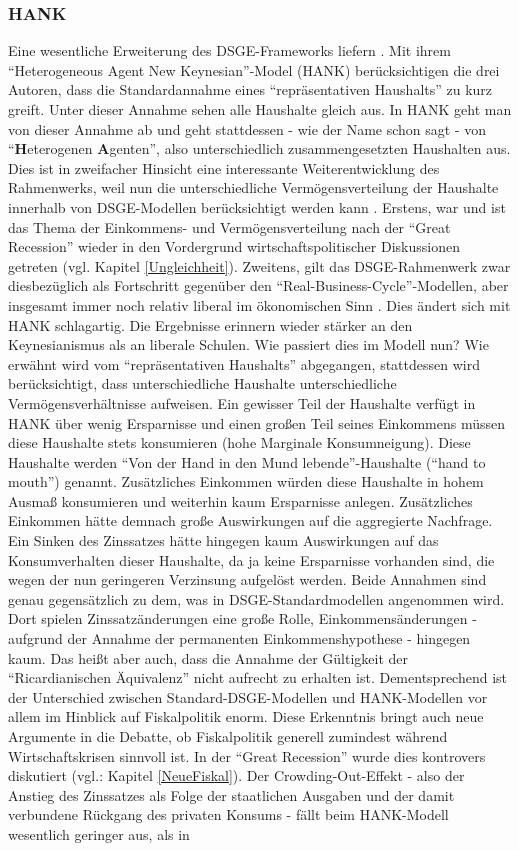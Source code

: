 \subsubsection{HANK}
Eine wesentliche Erweiterung des DSGE-Frameworks liefern \textcite{Kaplan2018}. Mit ihrem "`Heterogeneous Agent New Keynesian"'-Model (HANK) berücksichtigen die drei Autoren, dass die Standardannahme eines "`repräsentativen Haushalts"' zu kurz greift. Unter dieser Annahme sehen alle Haushalte gleich aus. In HANK geht man von dieser Annahme ab und geht stattdessen - wie der Name schon sagt - von "`\textbf{H}eterogenen \textbf{A}genten"', also unterschiedlich zusammengesetzten Haushalten aus. Dies ist in zweifacher Hinsicht eine interessante Weiterentwicklung des Rahmenwerks, weil nun die unterschiedliche Vermögensverteilung der Haushalte innerhalb von DSGE-Modellen berücksichtigt werden kann \parencite[S. 167]{Kaplan2018b}. Erstens, war und ist das Thema der Einkommens- und Vermögensverteilung nach der "`Great Recession"' wieder in den Vordergrund wirtschaftspolitischer Diskussionen getreten (vgl. Kapitel \ref{Ungleichheit}). Zweitens, gilt das DSGE-Rahmenwerk zwar diesbezüglich als Fortschritt gegenüber den "`Real-Business-Cycle"'-Modellen, aber insgesamt immer noch relativ liberal im ökonomischen Sinn \parencite[S. 309]{Romer2019}. Dies ändert sich mit HANK schlagartig. Die Ergebnisse erinnern wieder stärker an den Keynesianismus als an liberale Schulen. Wie passiert dies im Modell nun? Wie erwähnt wird vom "`repräsentativen Haushalts"' abgegangen, stattdessen wird berücksichtigt, dass unterschiedliche Haushalte unterschiedliche Vermögensverhältnisse aufweisen. Ein gewisser Teil der Haushalte verfügt in HANK über wenig Ersparnisse und einen großen Teil seines Einkommens müssen diese Haushalte stets konsumieren (hohe Marginale Konsumneigung). Diese Haushalte werden "`Von der Hand in den Mund lebende"'-Haushalte ("`hand to mouth"') genannt. Zusätzliches Einkommen würden diese Haushalte in hohem Ausmaß konsumieren und weiterhin kaum Ersparnisse anlegen. Zusätzliches Einkommen hätte demnach große Auswirkungen auf die aggregierte Nachfrage. Ein Sinken des Zinssatzes hätte hingegen kaum Auswirkungen auf das Konsumverhalten dieser Haushalte, da ja keine Ersparnisse vorhanden sind, die wegen der nun geringeren Verzinsung aufgelöst werden. Beide Annahmen sind genau gegensätzlich zu dem, was in DSGE-Standardmodellen angenommen wird. Dort spielen Zinssatzänderungen eine große Rolle, Einkommensänderungen - aufgrund der Annahme der permanenten Einkommenshypothese - hingegen kaum. Das heißt aber auch, dass die Annahme der Gültigkeit der "`Ricardianischen Äquivalenz"' nicht aufrecht zu erhalten ist. Dementsprechend ist der Unterschied zwischen Standard-DSGE-Modellen und HANK-Modellen vor allem im Hinblick auf Fiskalpolitik enorm. Diese Erkenntnis bringt auch neue Argumente in die Debatte, ob Fiskalpolitik generell zumindest während Wirtschaftskrisen sinnvoll ist. In der "`Great Recession"' wurde dies kontrovers diskutiert (vgl.: Kapitel \ref{NeueFiskal}). Der Crowding-Out-Effekt - also der Anstieg des Zinssatzes als Folge der staatlichen Ausgaben und der damit verbundene Rückgang des privaten Konsums - fällt beim HANK-Modell wesentlich geringer aus, als in 